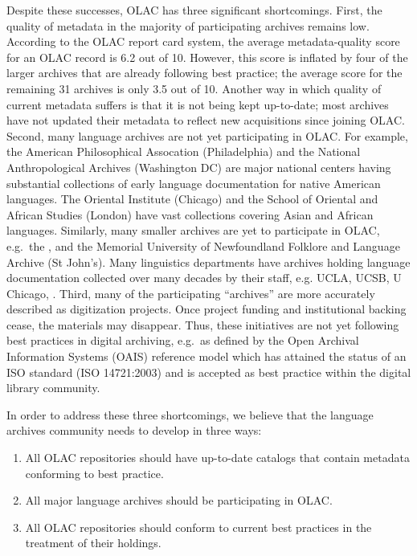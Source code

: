 Despite these successes, OLAC has three significant shortcomings.
First, the quality of metadata in the majority of participating archives remains
low.  According to the OLAC report card system, the average 
metadata-quality score for an OLAC record is 6.2 out of 10. However,
this score is
inflated by four of the larger archives that are already
following best practice; the average score for the remaining 31 archives
is only 3.5 out of 10.  Another way in which quality of current metadata suffers is that it is not being kept up-to-date; most archives have not
updated their metadata to reflect new acquisitions since joining OLAC.
Second, many language archives are not yet participating in OLAC.  For
example, the American Philosophical Assocation (Philadelphia) and the
National Anthropological Archives (Washington DC) are major national
centers having substantial collections of early language documentation
for native American languages.  The Oriental Institute (Chicago) and
the School of Oriental and African Studies (London) have vast
collections covering Asian and African languages.  Similarly, many
smaller archives are yet to participate in OLAC, e.g.\ the
\todo{[EXAMPLE]}, and the
Memorial University of Newfoundland Folklore and Language Archive (St
John's).  Many linguistics departments have archives holding language
documentation collected over many decades by their staff, e.g. UCLA,
UCSB, U Chicago, \todo{[MORE]}.
Third, many of the participating ``archives'' are more accurately described
as digitization projects.  Once project funding and institutional
backing cease, the materials may disappear.  Thus, these
initiatives are not yet following best practices in digital archiving,
e.g.\ as defined by the Open Archival Information Systems (OAIS)
reference model \citep{OAIS02} which has attained the status of an ISO
standard (ISO 14721:2003) and is accepted as best practice within the
digital library community.


In order to address these three shortcomings, we believe that the
language archives community needs to develop in three ways:

\begin{enumerate}\setlength{\itemsep}{0pt}
\item All OLAC repositories should have up-to-date catalogs
      that contain metadata conforming to best practice.
\item All major language archives should be participating in OLAC.
\item All OLAC repositories should conform to current best practices
      in the treatment of their holdings.
\end{enumerate}

